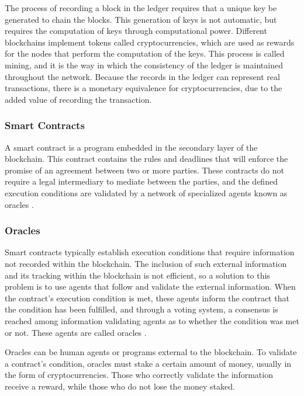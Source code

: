 The process of recording a block in the ledger requires that a unique key be generated to chain the blocks. This generation of keys is not automatic, but requires the computation of keys through computational power. Different blockchains implement tokens called cryptocurrencies, which are used as rewards for the nodes that perform the computation of the keys. This process is called mining, and it is the way in which the consistency of the ledger is maintained throughout the network. Because the records in the ledger can represent real transactions, there is a monetary equivalence for cryptocurrencies, due to the added value of recording the transaction.

\subsubsection{Smart Contracts}
\label{subsec:smart_contracts}

A smart contract is a program embedded in the secondary layer of the blockchain. This contract contains the rules and deadlines that will enforce the promise of an agreement between two or more parties. These contracts do not require a legal intermediary to mediate between the parties, and the defined execution conditions are validated by a network of specialized agents known as oracles \parencite{alma9919406254106531}.

\subsubsection{Oracles}
\label{subsubsec:oracles}

Smart contracts typically establish execution conditions that require information not recorded within the blockchain. The inclusion of such external information and its tracking within the blockchain is not efficient, so a solution to this problem is to use agents that follow and validate the external information. When the contract's execution condition is met, these agents inform the contract that the condition has been fulfilled, and through a voting system, a consensus is reached among information validating agents as to whether the condition was met or not. These agents are called oracles \parencite{HassanAmmar2023Fttt}.
    
Oracles can be human agents or programs external to the blockchain. To validate a contract's condition, oracles must stake a certain amount of money, usually in the form of cryptocurrencies. Those who correctly validate the information receive a reward, while those who do not lose the money staked.
    
